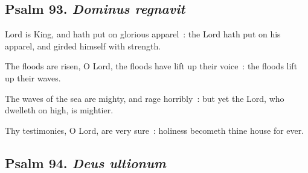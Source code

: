 \subsection{Psalm 93. \textit{Dominus regnavit}}

 Lord is King, and hath put on glorious apparel~: the Lord hath put on his apparel, and girded himself with strength.\par
{}
The floods are risen, O Lord, the floods have lift up their voice~: the floods lift up their waves.\par
{}The waves of the sea are mighty, and rage horribly~: but yet the Lord, who dwelleth on high, is mightier.\par
{}Thy testimonies, O Lord, are very sure~: holiness becometh thine house for ever.\par

\subsection{Psalm 94. \textit{Deus ultionum}}

